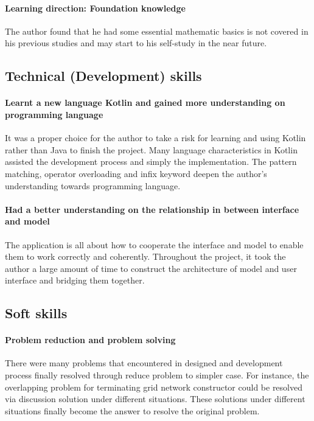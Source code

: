 \paragraph{Learning direction: Foundation knowledge}
The author found that he had some essential mathematic basics is not covered in his previous studies and
may start to his self-study in the near future.

\subsection{Technical (Development) skills}

\paragraph{Learnt a new language Kotlin and gained more understanding on programming language}
It was a proper choice for the author to take a risk for learning and using Kotlin rather than Java to finish
the project. Many language characteristics in Kotlin assisted the development process and simply the
implementation. The pattern matching, operator overloading and infix keyword deepen the author's understanding
towards programming language.

\paragraph{Had a better understanding on the relationship in between interface and model}
The application is all about how to cooperate the interface and model to enable them to work correctly and coherently.
Throughout the project, it took the author a large amount of time to construct the architecture of model and
user interface and bridging them together.


\subsection{Soft skills}
\paragraph{Problem reduction and problem solving}
There were many problems that encountered in designed and development process finally
resolved through reduce problem to simpler case. For instance, the overlapping problem
for terminating grid network constructor could be resolved via discussion solution under
different situations. These solutions under different situations finally become the answer
to resolve the original problem.

